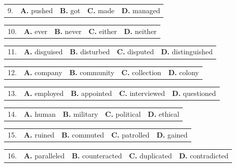\documentclass[UTF8,11pt]{ctexart}
\begin{document}
\noindent\begin{tabularx}{\linewidth}{@{}lXXXX@{}}9. & \textbf{A.} pushed & \textbf{B.} got & \textbf{C.} made & \textbf{D.} managed\\\end{tabularx}\par

\noindent\begin{tabularx}{\linewidth}{@{}lXXXX@{}}10. & \textbf{A.} ever & \textbf{B.} never & \textbf{C.} either & \textbf{D.} neither\\\end{tabularx}\par

\noindent\begin{tabularx}{\linewidth}{@{}lXXXX@{}}11. & \textbf{A.} disguised & \textbf{B.} disturbed & \textbf{C.} disputed & \textbf{D.} distinguished\\\end{tabularx}\par

\noindent\begin{tabularx}{\linewidth}{@{}lXXXX@{}}12. & \textbf{A.} company & \textbf{B.} community & \textbf{C.} collection & \textbf{D.} colony\\\end{tabularx}\par

\noindent\begin{tabularx}{\linewidth}{@{}lXXXX@{}}13. & \textbf{A.} employed & \textbf{B.} appointed & \textbf{C.} interviewed & \textbf{D.} questioned\\\end{tabularx}\par

\noindent\begin{tabularx}{\linewidth}{@{}lXXXX@{}}14. & \textbf{A.} human & \textbf{B.} military & \textbf{C.} political & \textbf{D.} ethical\\\end{tabularx}\par

\noindent\begin{tabularx}{\linewidth}{@{}lXXXX@{}}15. & \textbf{A.} ruined & \textbf{B.} commuted & \textbf{C.} patrolled & \textbf{D.} gained\\\end{tabularx}\par

\noindent\begin{tabularx}{\linewidth}{@{}lXXXX@{}}16. & \textbf{A.} paralleled & \textbf{B.} counteracted & \textbf{C.} duplicated & \textbf{D.} contradicted\\\end{tabularx}\par
\end{document}
